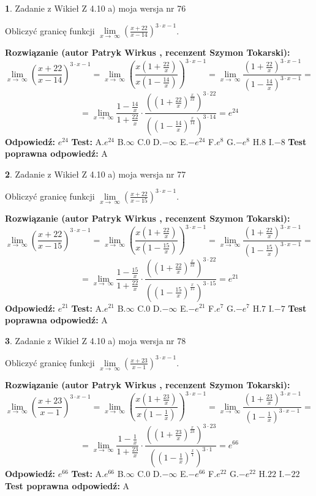\documentclass[12pt, a4paper]{article}
\theoremstyle{definition} %
\newtheorem{zad}{}
\newcommand{\zadStart}[1]{\begin{zad}#1\newline}
\newcommand{\zadStop}{\end{zad}}
\newcommand{\rozwStart}[2]{\noindent \textbf{Rozwiązanie (autor #1 , recenzent #2): }\newline}
\newcommand{\rozwStop}{\newline}
\newcommand{\odpStart}{\noindent \textbf{Odpowiedź:}\newline}
\newcommand{\odpStop}{\newline}
\newcommand{\testStart}{\noindent \textbf{Test:}\newline}
\newcommand{\testStop}{\newline}
\newcommand{\kluczStart}{\noindent \textbf{Test poprawna odpowiedź:}\newline}
\newcommand{\kluczStop}{\newline}
\begin{document}
\zadStart{Zadanie z Wikieł Z 4.10 a) moja wersja nr 76}

Obliczyć granicę funkcji  $\lim\limits_{x\to\ \infty}(\frac{x+22}{x-14})^{3\cdot x-1}$.
\zadStop
\rozwStart{Patryk Wirkus}{Szymon Tokarski}
$$\lim\limits_{x\to\ \infty}(\frac{x+22}{x-14})^{3\cdot x-1} = \lim\limits_{x\to\ \infty}(\frac{x(1+\frac{22}{x})}{x(1-\frac{14}{x})})^{3\cdot x-1}=\lim\limits_{x\to\ \infty}\frac{(1+\frac{22}{x})^{3\cdot x-1}}{(1-\frac{14}{x})^{3\cdot x-1}}=$$
$$=\lim\limits_{x\to\ \infty}\frac{1-\frac{14}{x}}{1+\frac{22}{x}}\cdot\frac{((1+\frac{22}{x})^{\frac{x}{22}})^{3\cdot22}}{((1-\frac{14}{x})^{\frac{x}{14}})^{3\cdot14}}=e^{24}$$
\rozwStop
\odpStart
$e^{24}$
\odpStop
\testStart
A.$e^{24}$ B.$\infty$ C.$0$ D.$-\infty$ E.$-e^{24}$
F.$e^{8}$ G.$-e^{8}$
H.$8$
I.$-8$
\testStop
\kluczStart
A
\kluczStop



\zadStart{Zadanie z Wikieł Z 4.10 a) moja wersja nr 77}

Obliczyć granicę funkcji  $\lim\limits_{x\to\ \infty}(\frac{x+22}{x-15})^{3\cdot x-1}$.
\zadStop
\rozwStart{Patryk Wirkus}{Szymon Tokarski}
$$\lim\limits_{x\to\ \infty}(\frac{x+22}{x-15})^{3\cdot x-1} = \lim\limits_{x\to\ \infty}(\frac{x(1+\frac{22}{x})}{x(1-\frac{15}{x})})^{3\cdot x-1}=\lim\limits_{x\to\ \infty}\frac{(1+\frac{22}{x})^{3\cdot x-1}}{(1-\frac{15}{x})^{3\cdot x-1}}=$$
$$=\lim\limits_{x\to\ \infty}\frac{1-\frac{15}{x}}{1+\frac{22}{x}}\cdot\frac{((1+\frac{22}{x})^{\frac{x}{22}})^{3\cdot22}}{((1-\frac{15}{x})^{\frac{x}{15}})^{3\cdot15}}=e^{21}$$
\rozwStop
\odpStart
$e^{21}$
\odpStop
\testStart
A.$e^{21}$ B.$\infty$ C.$0$ D.$-\infty$ E.$-e^{21}$
F.$e^{7}$ G.$-e^{7}$
H.$7$
I.$-7$
\testStop
\kluczStart
A
\kluczStop



\zadStart{Zadanie z Wikieł Z 4.10 a) moja wersja nr 78}

Obliczyć granicę funkcji  $\lim\limits_{x\to\ \infty}(\frac{x+23}{x-1})^{3\cdot x-1}$.
\zadStop
\rozwStart{Patryk Wirkus}{Szymon Tokarski}
$$\lim\limits_{x\to\ \infty}(\frac{x+23}{x-1})^{3\cdot x-1} = \lim\limits_{x\to\ \infty}(\frac{x(1+\frac{23}{x})}{x(1-\frac{1}{x})})^{3\cdot x-1}=\lim\limits_{x\to\ \infty}\frac{(1+\frac{23}{x})^{3\cdot x-1}}{(1-\frac{1}{x})^{3\cdot x-1}}=$$
$$=\lim\limits_{x\to\ \infty}\frac{1-\frac{1}{x}}{1+\frac{23}{x}}\cdot\frac{((1+\frac{23}{x})^{\frac{x}{23}})^{3\cdot23}}{((1-\frac{1}{x})^{\frac{x}{1}})^{3\cdot1}}=e^{66}$$
\rozwStop
\odpStart
$e^{66}$
\odpStop
\testStart
A.$e^{66}$ B.$\infty$ C.$0$ D.$-\infty$ E.$-e^{66}$
F.$e^{22}$ G.$-e^{22}$
H.$22$
I.$-22$
\testStop
\kluczStart
A
\kluczStop
\end{document}
